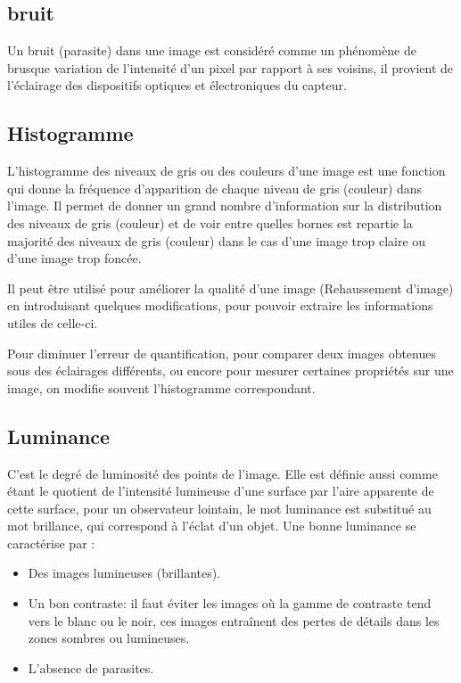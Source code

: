 \documentclass[11pt]{report}
\begin{document}
\subsection{bruit}
Un bruit (parasite) dans une image est considéré comme un phénomène de brusque
variation de l’intensité d’un pixel par rapport à ses voisins, il provient de l’éclairage des
dispositifs optiques et électroniques du capteur.

\subsection{Histogramme}
L’histogramme des niveaux de gris ou des couleurs d’une image est une fonction qui
donne la fréquence d’apparition de chaque niveau de gris (couleur) dans l’image. Il permet
de donner un grand nombre d’information sur la distribution des niveaux de gris (couleur) et
de voir entre quelles bornes est repartie la majorité des niveaux de gris (couleur) dans le cas
d’une image trop claire ou d’une image trop foncée.

Il peut être utilisé pour améliorer la qualité d’une image (Rehaussement d’image) en
introduisant quelques modifications, pour pouvoir extraire les informations utiles de celle-ci.

Pour diminuer l’erreur de quantification, pour comparer deux images obtenues sous
des éclairages différents, ou encore pour mesurer certaines propriétés sur une image, on
modifie souvent l’histogramme correspondant.

\subsection{Luminance}
C’est le degré de luminosité des points de l’image. Elle est définie aussi comme étant
le quotient de l’intensité lumineuse d’une surface par l’aire apparente de cette surface, pour
un observateur lointain, le mot luminance est substitué au mot brillance, qui correspond à
l’éclat d’un objet. Une bonne luminance se caractérise par :
\begin{itemize}
\item Des images lumineuses (brillantes).
\item Un bon contraste: il faut éviter les images où la gamme de contraste tend vers le
blanc ou le noir, ces images entraînent des pertes de détails dans les zones sombres
ou lumineuses.
\item L’absence de parasites.

\end{itemize}
\end{document}
